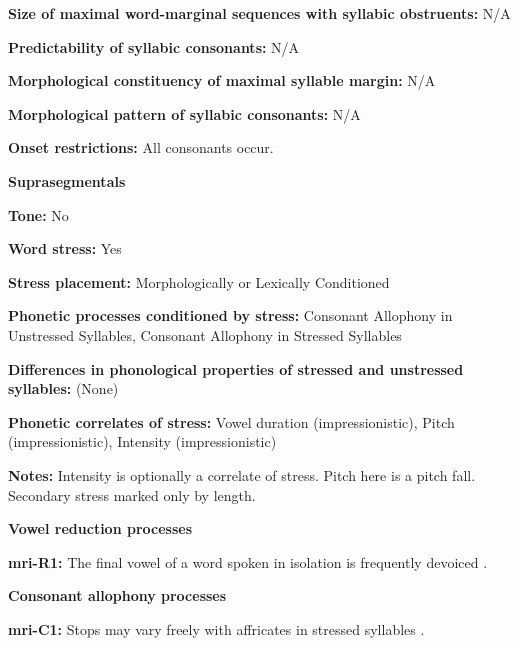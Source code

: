 \textbf{Size of maximal word{}-marginal sequences with syllabic obstruents:} N/A



\textbf{Predictability of syllabic consonants:} N/A



\textbf{Morphological constituency of maximal syllable margin:} N/A



\textbf{Morphological pattern of syllabic consonants:} N/A



\textbf{Onset restrictions:} All consonants occur.



\textbf{Suprasegmentals}



\textbf{Tone:} No



\textbf{Word stress:} Yes



\textbf{Stress placement:} Morphologically or Lexically Conditioned



\textbf{Phonetic processes conditioned by stress:} Consonant Allophony in Unstressed Syllables, Consonant Allophony in Stressed Syllables



\textbf{Differences in phonological properties of stressed and unstressed syllables:} (None)



\textbf{Phonetic correlates of stress:} Vowel duration (impressionistic), Pitch (impressionistic), Intensity (impressionistic)



\textbf{Notes:} Intensity is optionally a correlate of stress. Pitch here is a pitch fall. Secondary stress marked only by length.



\textbf{Vowel reduction processes}



\textbf{mri-R1:} The final vowel of a word spoken in isolation is frequently devoiced \citep[546]{Bauer1999}.



\textbf{Consonant allophony processes}



\textbf{mri-C1:} Stops may vary freely with affricates in stressed syllables \citep[545]{Bauer1999}.



